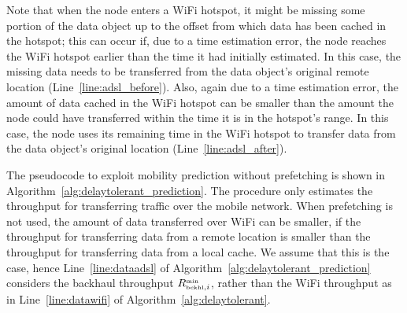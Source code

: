 \documentclass{sig-alternate}
\begin{document}
Note that when the node enters a WiFi hotspot, it might be missing some portion of the data object up to the offset from which  data has been cached in the hotspot; this can occur if, due to a time estimation error, the node reaches the WiFi hotspot earlier than the time it had initially estimated.
In this case, the missing data needs to be transferred from the data object's original remote location (Line~\ref{line:adsl_before}). Also, again due to a time estimation error, the amount of data cached in the WiFi hotspot can be smaller than the amount the node could have transferred within the time it is in the   hotspot's range. In this  case, the node uses its remaining time in the WiFi hotspot to transfer data from the data object's original location (Line~\ref{line:adsl_after}).


The pseudocode to exploit mobility prediction without prefetching is shown in Algorithm~\ref{alg:delaytolerant_prediction}.
The procedure only estimates the throughput for transferring traffic over the mobile network. When prefetching is not used, the amount of data transferred over WiFi can be smaller, if  the throughput for transferring data from a remote location is smaller than the throughput for transferring data from a local cache. We assume that this is the case, hence Line~\ref{line:dataadsl} of Algorithm~\ref{alg:delaytolerant_prediction} considers the backhaul throughput $R^{\mbox{{\tiny min}}}_{\mbox{{\tiny bckhl}},i}$, rather than the WiFi throughput as in Line~\ref{line:datawifi} of Algorithm~\ref{alg:delaytolerant}.
\end{document}
